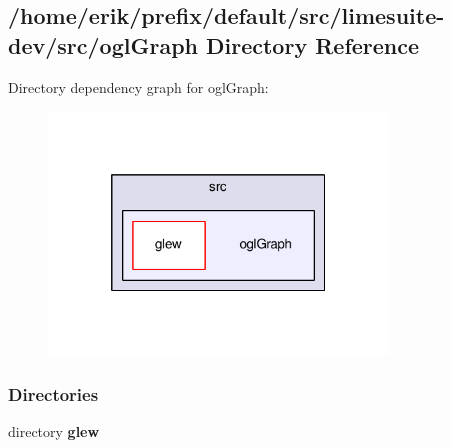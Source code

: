\subsection{/home/erik/prefix/default/src/limesuite-\/dev/src/ogl\+Graph Directory Reference}
\label{dir_d2a712f37048007e8347377d8f16a02d}
Directory dependency graph for ogl\+Graph\+:
\nopagebreak
\begin{figure}[H]
\begin{center}
\leavevmode
\includegraphics[width=256pt]{dir_d2a712f37048007e8347377d8f16a02d_dep}
\end{center}
\end{figure}
\subsubsection*{Directories}
\begin{DoxyCompactItemize}
\item 
directory {\bf glew}
\end{DoxyCompactItemize}
